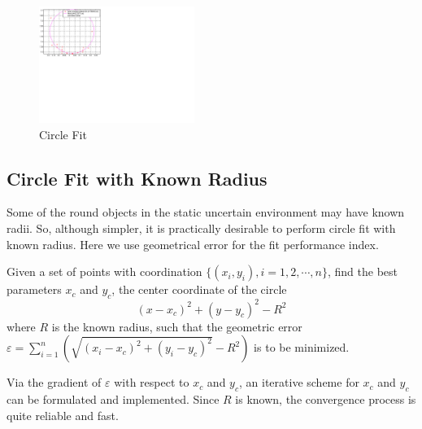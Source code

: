 \documentclass{cdcarta4}
\begin{document}
\begin{figure}
    \includegraphics[width=0.45\textwidth]{img/CircleFit} \caption{Circle Fit} \label{fig:CirFit}
\end{figure}








\subsection{Circle Fit with Known Radius}
\label{sec32}


Some of the round objects in the static uncertain environment may have known radii.
So, although simpler, it is practically desirable to perform circle fit with known radius.
Here we use geometrical error for the fit performance index.


Given a set of points with coordination $\{ (x_i,y_i), i=1,2, \cdots, n\} $,   find the best parameters $x_c$ and $y_c$, the center coordinate of the circle
\[
(x-x_c)^2+(y-y_c)^2  - R^2
\]
where $R$ is the known radius, such that the geometric error 
 $\varepsilon = \sum_{i=1}^{n} (\sqrt{ (x_i-x_c)^2+(y_i-y_c)^2 } - R^2)$ 
is to be  minimized.  

Via the gradient of $\varepsilon$ with respect to $x_c$ and $y_c$, an iterative scheme for  $x_c$ and $y_c$ can be formulated and implemented. Since $R$ is known, the convergence process is quite reliable and fast.
%
\end{document}
